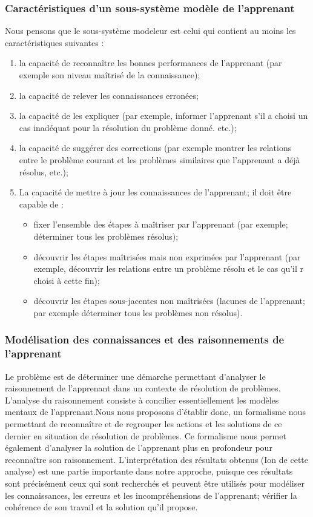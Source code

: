 \subsubsection{Caractéristiques d'un sous-système modèle de l'apprenant }
Nous pensons que le sous-système modeleur est celui qui contient au moins les
caractéristiques suivantes :

\begin{enumerate}
    \item la capacité de reconnaître les bonnes performances de l'apprenant (par exemple son niveau maîtrisé de la connaissance);
    \item la capacité de relever les connaissances erronées;
    \item la capacité de les expliquer (par exemple, informer l'apprenant s'il a choisi un cas inadéquat pour la résolution du problème donné. etc.);
    \item  la capacité de suggérer des corrections (par exemple montrer les relations entre le problème courant et les problèmes similaires que l'apprenant a déjà résolus, etc.);
    \item La capacité de mettre à jour les connaissances de l'apprenant; il doit être capable de  : 
    \begin{itemize}
        \item fixer l'ensemble des étapes à maîtriser par l'apprenant (par exemple; déterminer
        tous les problèmes résolus);
        \item découvrir les étapes maîtrisées mais non exprimées par l'apprenant (par exemple, découvrir les relations entre un problème résolu et le cas qu'il r choisi à cette fin);
        \item découvrir les étapes sous-jacentes non maîtrisées (lacunes de l'apprenant; par exemple déterminer tous les problèmes non résolus).
    \end{itemize}
\end{enumerate}


\subsubsection{Modélisation des connaissances et des raisonnements de
l'apprenant }
Le problème est de déterminer une démarche permettant d'analyser le raisonnement de
l'apprenant dans un contexte de résolution de problèmes. L'analyse du raisonnement
consiste à concilier essentiellement les modèles mentaux de l'apprenant.Nous nous proposons d'établir donc, un formalisme nous permettant de reconnaître et de regrouper les actions et les solutions de ce dernier en situation de résolution de problèmes. Ce formalisme nous permet également d'analyser la solution de l'apprenant plus en profondeur pour reconnaître son raisonnement. L'interprétation des résultats obtenus (Ion de cette analyse) est une partie importante dans notre approche, puisque ces résultats sont précisément ceux qui sont recherchés et peuvent être utilisés pour modéliser les connaissances, les erreurs et les incompréhensions de l'apprenant; vérifier la cohérence de son travail et la solution qu'il propose. 

